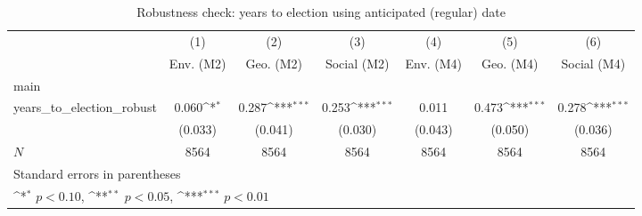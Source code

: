 \begin{table}[htbp]\centering
\def\sym#1{\ifmmode^{#1}\else\(^{#1}\)\fi}
\caption{Robustness check: years to election using anticipated (regular) date}
\begin{tabular}{l*{6}{c}}
\toprule
            &\multicolumn{1}{c}{(1)}&\multicolumn{1}{c}{(2)}&\multicolumn{1}{c}{(3)}&\multicolumn{1}{c}{(4)}&\multicolumn{1}{c}{(5)}&\multicolumn{1}{c}{(6)}\\
            &\multicolumn{1}{c}{Env. (M2)}&\multicolumn{1}{c}{Geo. (M2)}&\multicolumn{1}{c}{Social (M2)}&\multicolumn{1}{c}{Env. (M4)}&\multicolumn{1}{c}{Geo. (M4)}&\multicolumn{1}{c}{Social (M4)}\\
\midrule
main        &                     &                     &                     &                     &                     &                     \\
years\_to\_election\_robust&       0.060\sym{*}  &       0.287\sym{***}&       0.253\sym{***}&       0.011         &       0.473\sym{***}&       0.278\sym{***}\\
            &     (0.033)         &     (0.041)         &     (0.030)         &     (0.043)         &     (0.050)         &     (0.036)         \\
\midrule
\(N\)       &        8564         &        8564         &        8564         &        8564         &        8564         &        8564         \\
\bottomrule
\multicolumn{7}{l}{\footnotesize Standard errors in parentheses}\\
\multicolumn{7}{l}{\footnotesize \sym{*} \(p<0.10\), \sym{**} \(p<0.05\), \sym{***} \(p<0.01\)}\\
\end{tabular}
\end{table}
